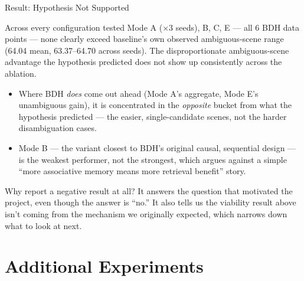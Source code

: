 \documentclass[aspectratio=169]{beamer}
\begin{document}
\begin{frame}{Result: Hypothesis Not Supported}
  \begin{alertblock}{Across every configuration tested}
    \footnotesize Mode A ($\times 3$ seeds), B, C, E — all 6 BDH data
    points — none clearly exceed baseline's own observed
    ambiguous-scene range (64.04 mean, 63.37--64.70 across seeds). The
    disproportionate ambiguous-scene advantage the hypothesis predicted
    does not show up consistently across the ablation.
  \end{alertblock}
  \vspace{0.2cm}
  \small
  \begin{itemize}
    \item Where BDH \emph{does} come out ahead (Mode A's aggregate,
      Mode E's unambiguous gain), it is concentrated in the
      \emph{opposite} bucket from what the hypothesis predicted — the
      easier, single-candidate scenes, not the harder disambiguation
      cases.
    \item Mode B — the variant closest to BDH's original causal,
      sequential design — is the weakest performer, not the strongest,
      which argues against a simple ``more associative memory means
      more retrieval benefit'' story.
  \end{itemize}
  \vspace{0.2cm}
  \begin{block}{Why report a negative result at all?}
    \footnotesize It answers the question that motivated the project,
    even though the answer is ``no.'' It also tells us the viability
    result above isn't coming from the mechanism we originally expected,
    which narrows down what to look at next.
  \end{block}
\end{frame}

\section{Additional Experiments}
\end{document}
